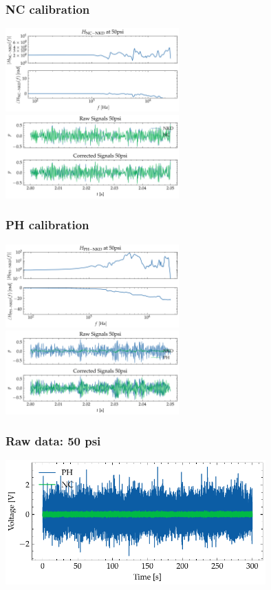 \documentclass[aspectratio=169,10pt]{beamer}
\begin{document}
\begin{frame}
    \frametitle{NC calibration}
    \centering
    \includegraphics[width=0.5\textwidth]{cali_30/50psi/NC-NKD/H_atm_npsg4096.png}
    \includegraphics[width=0.5\textwidth]{cali_30/50psi/NC-NKD/nc_recon_atm_npsg4096.png}
\end{frame}

\begin{frame}
    \frametitle{PH calibration}
    \centering
    \includegraphics[width=0.5\textwidth]{cali_30/50psi/PH-NKD/H_atm_npsg4096.png}
    \includegraphics[width=0.5\textwidth]{cali_30/50psi/PH-NKD/ph_recon_atm_npsg4096.png}
\end{frame}

\begin{frame}
    \frametitle{Raw data: 50 psi}
    \centering
    \includegraphics[width=0.75\textwidth]{cali_30/50psi/raw_signals_atm.pdf}
\end{frame}
\end{document}

